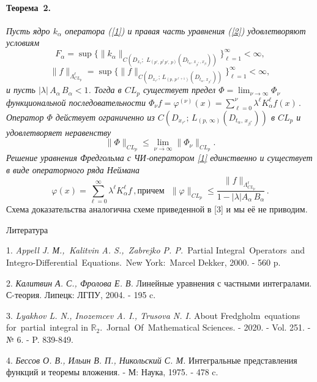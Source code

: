 \paragraph{Теорема~2.}
{\it Пусть
ядро $k_\alpha$ оператора (\ref{1}) и правая часть уравнения (\ref{2}) удовлетворяют условиям
$$F_\alpha=\sup \biggl\{\|k_{\alpha}\|_{C(D_{x_\tau};\,\, L_{(p',\,p^\ell\, p',\, p)}(D_{t_\alpha,\, x_{\beta^*}\,, x_\beta}))}\biggl\}_{\ell=1}^\infty<\infty,$$
 $$\|f\|_{\Lambda_{CL_p}^{\ell}}=\sup \biggl\{\|f\|_{C(D_{x_{\tau^*}};\,L_{(p,\,p^{\ell+1})}(D_{t_\alpha,\,x_{\beta^*}}))}\biggl\}_{\ell=1}^\infty<\infty,$$
и пусть    $|\lambda|\,A_\alpha\,B_\alpha<1$. Тогда в  $CL_p$ существует предел  $\Phi=\lim_{\nu\to\infty}\Phi_\nu$
функциональной последовательности
$
\Phi_\nu f= \varphi^{(\nu)}(x)=\sum\limits_{\ell=0}^\nu \lambda^\ell K_\alpha^\ell f(x)\,.
$
Оператор $\Phi$ действует ограниченно из $C(D_{x_{\tau^*}};\,L_{(p,\,\infty)}(D_{t_\alpha,\,x_{\beta^*}}))$ в
 $CL_p$  и удовлетворяет неравенству
$$
\|\Phi\|_{CL_p}\leq{\lim_{\overline{\nu\to\infty}}}\|\Phi_\nu\|_{CL_p}.
$$
 Решение уравнения Фредгольма  с ЧИ-оператором
\eqref{1} единственно и существует в виде операторного ряда Неймана
$$
\varphi(x)=\sum\limits_{\ell=0}^\infty \lambda^\ell K_\alpha^\ell f\,,
\text{причем}\,\,\,\,\|\varphi\|_{CL_{p}}\leq\frac{\|f\|_{\Lambda_{CL_p}^\ell}}{1-|\lambda| A_\alpha\,B_\alpha}\,.
$$}
Схема доказательства аналогична схеме приведенной в [3] и мы её не приводим.

\begin{center}
Литература
\end{center}

1. {\it Appell J. М.,\, Kalitvin A. S.,\, Zabrejko P. P.}\, Partial Integral\, Operators\, and\, Integro-Differential\, Equations.\, New York:\, Marcel Dekker, 2000. - 560 p.

2. {\it Калитвин А. С., Фролова Е. В.}
Линейные уравнения с частными интегралами. С-теория. Липецк: ЛГПУ, 2004. - 195 c.

3. {\it Lyakhov L. N., Inozemcev A. I., Trusova N. I.} About Fredgholm\, equations\, for\, partial\, integral in $\mathbb{R}_2$.\, Jornal\, Of\, Mathematical Sciences. - 2020. - Vol. 251. - № 6. - P. 839-849.

4. {\it Бессов О. В., Ильин В. П., Никольский С. М.} Интегральные представления функций и теоремы вложения. - М: Наука, 1975. - 478 c.
